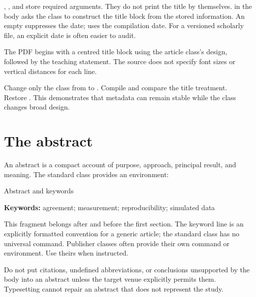 , , and  store required arguments. They do not
print the title by themselves.  in the body asks the class to
construct the title block from the stored information. An empty
\required{} suppresses the date;  uses the compilation
date. For a versioned scholarly file, an explicit date is often easier to
audit.

\expectedoutput

The PDF begins with a centred title block using the article class's design,
followed by the teaching statement. The source does not specify font sizes or
vertical distances for each line.

\begin{tryit}
Change only the class from  to . Compile and compare
the title treatment. Restore . This demonstrates that metadata
can remain stable while the class changes broad design.
\end{tryit}

\section{The abstract}

An abstract is a compact account of purpose, approach, principal result, and
meaning. The standard  class provides an environment:

\begin{latexcode}{Abstract and keywords}
\begin{abstract}
We demonstrate a reproducible workflow for comparing two
measurement methods using simulated paired values. The example
is pedagogical and makes no empirical claim.
\end{abstract}

\noindent\textbf{Keywords:} agreement; measurement; reproducibility;
simulated data
\end{latexcode}

This fragment belongs after  and before the first section. The
keyword line is an explicitly formatted convention for a generic article; the
standard class has no universal  command. Publisher classes often
provide their own command or environment. Use theirs when instructed.

\begin{goodpractice}
Do not put citations, undefined abbreviations, or conclusions unsupported by
the body into an abstract unless the target venue explicitly permits them.
Typesetting cannot repair an abstract that does not represent the study.
\end{goodpractice}

